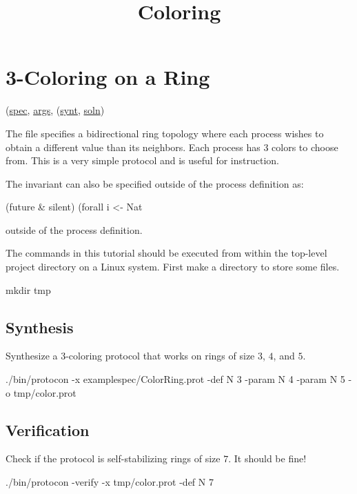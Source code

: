 
\title{Coloring}
\date{}



\tableofcontents

\section{3-Coloring on a Ring}
\label{sec:ColorRing}

(\href{\examplespec/ColorRing.prot}{spec},
\href{\examplesett/ColorRing.args}{args},
(\href{\examplespec/ColorRing.prot}{synt},
\href{\examplesoln/ColorRing.prot}{soln})

The  file specifies a bidirectional ring topology where each process wishes to obtain a different value than its neighbors.
Each process has $3$ colors to choose from.
This is a very simple protocol and is useful for instruction.

The invariant can also be specified outside of the process definition as:
\begin{code}
(future & silent)
  (forall i <- Nat %
\end{code}
outside of the process definition.

The commands in this tutorial should be executed from within the top-level project directory on a Linux system.
First make a directory  to store some files.
\begin{code}
mkdir tmp
\end{code}

\subsection{Synthesis}
Synthesize a 3-coloring protocol that works on rings of size $3$, $4$, and $5$.
\begin{code}
./bin/protocon -x examplespec/ColorRing.prot -def N 3 -param N 4 -param N 5 -o tmp/color.prot
\end{code}

\subsection{Verification}
Check if the protocol is self-stabilizing rings of size $7$. It should be fine!
\begin{code}
./bin/protocon -verify -x tmp/color.prot -def N 7
\end{code}

